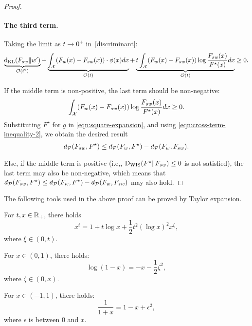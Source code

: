 \begin{proof}
\paragraph{The third term.}
Taking the limit as $t \to 0^+$ in~\eqref{discriminant}:
\begin{align*} 
\underbrace{\mathrm{d}_{\mathrm{KL}}(F_{sw} \| w')}_{\mathcal{O} (t^2)} + \underbrace{\int_{\mathcal{X}} (F_w(x) - F_{sw}(x)) \cdot \phi(x) d x}_{\mathcal{O} (t)} + \underbrace{t \int_{\mathcal{X}} (F_w(x) - F_{sw}(x)) \log \frac{F_{sw}(x)}{F^\star(x)} d x}_{\mathcal{O} (t)} \ge 0.
\end{align*}

If the middle term is non-positive, the last term should be non-negative:
\begin{align}
    \int_{\mathcal{X}} (F_w(x) - F_{sw}(x)) \log \frac{F_{sw}(x)}{F^\star(x)} d x \ge 0. \label{eqn:cross-term-inequality-2}
\end{align}
Substituting $F^\star$ for $g$ in \eqref{eqn:square-expansion}, and using \eqref{eqn:cross-term-inequality-2}, we obtain the desired result
\begin{align*}
    d_\mathcal{P}(F_{sw}, F^\star) \le d_\mathcal{P}(F_w, F^\star) - d_\mathcal{P}(F_w, F_{sw}).
\end{align*}

Else, if the middle term is positive (i.e,, $\mathrm{D}_{\mathrm{WIS}}(F^\star \| F_{sw}) \le 0$ is not satisfied), the last term may also be non-negative, which means that $d_\mathcal{P}(F_{sw}, F^\star) \le d_\mathcal{P}(F_w, F^\star) - d_\mathcal{P}(F_w, F_{sw})$ may also hold.

\end{proof}





The following tools used in the above proof can be proved by Taylor expansion.

\begin{claim} \label{lemma:taylor}
For $t,x \in \mathbb{R}_+$, there holds
$$x^{t} = 1 + t\log x + \frac{1}{2}t^2(\log x)^2 x^\xi,$$
where $\xi \in (0,t)$.
\end{claim}


\begin{claim} \label{lemma:taylor_log}
For $x \in (0,1)$, there holds:
$$\log (1-x) = -x - \frac{1}{2}\zeta^2,$$
where $\zeta \in (0,x)$.
\end{claim}


\begin{claim} \label{lemma:taylor_frac}
For $x \in (-1,1)$, there holds:
$$\frac{1}{1+x}=1-x+\epsilon^2,$$
where $\epsilon$ is between $0$ and $x$.
\end{claim}





